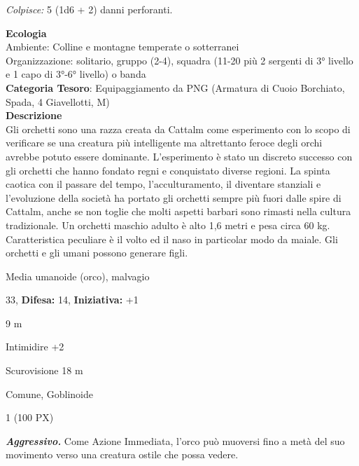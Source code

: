 \begin{multicols}{2}
{\emph{Colpisce:} 5 (1d6 + 2) danni perforanti.

\textbf{Ecologia}\\
Ambiente: Colline e montagne temperate o sotterranei\\
Organizzazione: solitario, gruppo (2-4), squadra (11-20 più 2 sergenti di 3° livello e 1 capo di 3°-6° livello) o banda \\
\textbf{Categoria Tesoro}: Equipaggiamento da PNG (Armatura di Cuoio Borchiato, Spada, 4 Giavellotti, M)\\
\textbf{Descrizione}\\
Gli orchetti sono una razza creata da Cattalm come esperimento con lo scopo di verificare se una creatura più intelligente ma altrettanto feroce degli orchi avrebbe potuto essere dominante.
L'esperimento è stato un discreto successo con gli orchetti che hanno fondato regni e conquistato diverse regioni. La spinta caotica con il passare del tempo, l'acculturamento, il diventare stanziali e l'evoluzione della società ha portato gli orchetti sempre più fuori dalle spire di Cattalm, anche se non toglie che molti aspetti barbari sono rimasti nella cultura tradizionale.
Un orchetti maschio adulto è alto 1,6 metri e pesa circa 60 kg. Caratteristica peculiare è il volto ed il naso in particolar modo da maiale. Gli orchetti e gli umani possono generare figli.

\noindent
\begin{description}[noitemsep, topsep=0pt, parsep=0pt, partopsep=0pt, leftmargin=0cm, labelwidth=2.2cm]
	\item[\textbf{Taglia/Tipo:}] Media umanoide (orco), malvagio
	\item[\textbf{Caratt.:}] 
	\item[\textbf{Punti Ferita:}] 33,  \textbf{Difesa:} 14,  \textbf{Iniziativa:} +1
	\item[\textbf{Movimento:}] 9 m
	\item[\textbf{Tiri Salvez.:}] 
	\item[\textbf{Comp.:}] Intimidire +2
	\item[\textbf{Sensi:}] Scurovisione 18 m
	\item[\textbf{Linguaggi:}] Comune, Goblinoide
	\item[\textbf{Sfida:}] 1 (100 PX)\smallskip
\end{description}

\emph{\textbf{Aggressivo.}} Come Azione Immediata, l'orco può muoversi fino a metà del suo movimento verso una creatura ostile che possa vedere.

}
\end{multicols}
